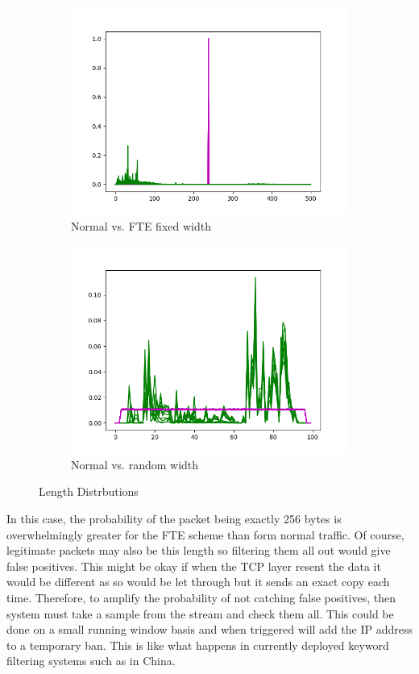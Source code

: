 \documentclass[10pt,a4paper]{article}
\begin{document}
\begin{figure}[h]
\begin{subfigure}[b]{.49\linewidth}
\includegraphics[width=\linewidth]{fake_length_dist}
\caption{Normal vs. FTE fixed width}
\label{fig:fake_length_dist}
\end{subfigure}
\begin{subfigure}[b]{.49\linewidth}
\includegraphics[width=\linewidth]{uniform_length_dist}
\caption{Normal vs. random width}
\label{fig:uniform_length_dist}
\end{subfigure}
\caption{Length Distrbutions}
\end{figure}

In this case, the probability of the packet being exactly 256 bytes is overwhelmingly greater for the FTE scheme than form normal traffic. Of course, legitimate packets may also be this length so filtering them all out would give false positives. This might be okay if when the TCP layer resent the data it would be different as so would be let through but it sends an exact copy each time. Therefore, to amplify the probability of not catching false positives, then system must take a sample from the stream and check them all. This could be done on a small running window basis and when triggered will add the IP address to a temporary ban. This is like what happens in currently deployed keyword filtering systems such as in China. 
\end{document}
